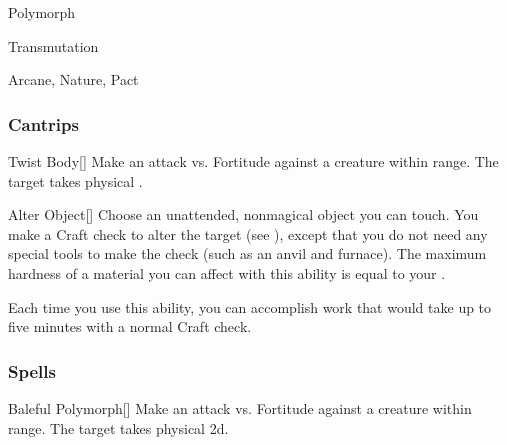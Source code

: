 \newpage
\begin{spellsection}{Polymorph}

\begin{spellheader}
\end{spellheader}


 Transmutation

 Arcane, Nature, Pact

\subsubsection{Cantrips}


\begin{freeability}{Twist Body}[]
Make an attack vs. Fortitude against a creature within \rngmed range.
\hit The target takes physical .
\end{freeability}


\begin{freeability}{Alter Object}[]
Choose an unattended, nonmagical object you can touch.
You make a Craft check to alter the target (see ), except that you do not need any special tools to make the check (such as an anvil and furnace).
The maximum hardness of a material you can affect with this ability is equal to your .

Each time you use this ability, you can accomplish work that would take up to five minutes with a normal Craft check.
\end{freeability}

\end{spellsection}


\subsubsection{Spells}


\lowercase{\hypertarget{spell:Baleful Polymorph}{}}\label{spell:Baleful Polymorph}
\begin{apability}[\nth{1}]{\hypertarget{spell:Baleful Polymorph}{Baleful Polymorph}}[]
Make an attack vs. Fortitude against a creature within \rngmed range.
\hit The target takes physical  \plus2d.
\end{apability}
\vspace{0.25em}



